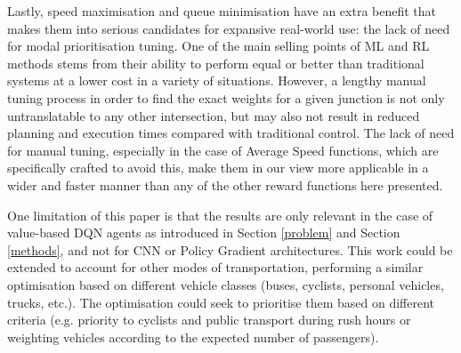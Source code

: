 \documentclass[conference]{IEEEtran}
\begin{document}
Lastly, speed maximisation and queue minimisation have an extra benefit that makes them into serious candidates for expansive real-world use: the lack of need for modal prioritisation tuning.
One of the main selling points of ML and RL methods stems from their ability to perform equal or better than traditional systems at a lower cost in a variety of situations.
However, a lengthy manual tuning process in order to find the exact weights for a given junction is not only untranslatable to any other intersection, but may also not result in reduced planning and execution times compared with traditional control.
The lack of need for manual tuning, especially in the case of Average Speed functions, which are specifically crafted to avoid this, make them in our view more applicable in a wider and faster manner than any of the other reward functions here presented.

One limitation of this paper is that the results are only relevant in the case of value-based DQN agents as introduced in Section \ref{problem} and Section \ref{methods}, and not for CNN or Policy Gradient architectures.
This work could be extended to account for other modes of transportation, performing a similar optimisation based on different vehicle classes (buses, cyclists, personal vehicles, trucks, etc.). The optimisation could seek to prioritise them based on different criteria (e.g. priority to cyclists and public transport during rush hours or weighting vehicles according to the expected number of passengers).

%
\end{document}
